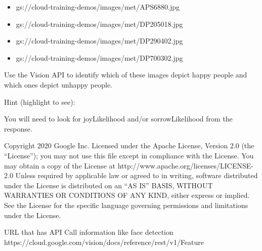 \documentclass[11pt]{article}
\providecommand{\tightlist}{%
      \setlength{\itemsep}{0pt}\setlength{\parskip}{0pt}}
\begin{document}
\begin{itemize}
\tightlist
\item
  gs://cloud-training-demos/images/met/APS6880.jpg
\item
  gs://cloud-training-demos/images/met/DP205018.jpg
\item
  gs://cloud-training-demos/images/met/DP290402.jpg
\item
  gs://cloud-training-demos/images/met/DP700302.jpg
\end{itemize}

Use the Vision API to identify which of these images depict happy people
and which ones depict unhappy people.

Hint (highlight to see):

You will need to look for joyLikelihood and/or sorrowLikelihood from the
response.

    Copyright 2020 Google Inc. Licensed under the Apache License, Version
2.0 (the ``License''); you may not use this file except in compliance
with the License. You may obtain a copy of the License at
http://www.apache.org/licenses/LICENSE-2.0 Unless required by applicable
law or agreed to in writing, software distributed under the License is
distributed on an ``AS IS'' BASIS, WITHOUT WARRANTIES OR CONDITIONS OF
ANY KIND, either express or implied. See the License for the specific
language governing permissions and limitations under the License.

    URL that has API Call information like face detection
https://cloud.google.com/vision/docs/reference/rest/v1/Feature
\end{document}
